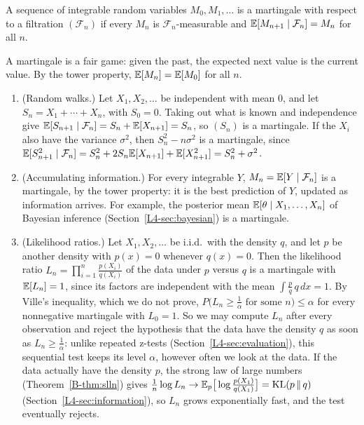 \begin{definition}[Martingale]\label{B-def:martingale}
    A sequence of integrable random variables $M_0, M_1, \ldots$ is a martingale with respect to a filtration $(\mathcal{F}_n)$ if every $M_n$ is $\mathcal{F}_n$-measurable and $\mathbb{E}[M_{n+1} \mid \mathcal{F}_n] = M_n$ for all $n$.
\end{definition}

A martingale is a fair game: given the past, the expected next value is the current value. By the tower property, $\mathbb{E}[M_n] = \mathbb{E}[M_0]$ for all $n$.

\begin{example}\label{B-ex:martingales}
    \begin{enumerate}
        \item (Random walks.) Let $X_1, X_2, \ldots$ be independent with mean $0$, and let $S_n = X_1 + \cdots + X_n$, with $S_0 = 0$. Taking out what is known and independence give $\mathbb{E}[S_{n+1} \mid \mathcal{F}_n] = S_n + \mathbb{E}[X_{n+1}] = S_n$, so $(S_n)$ is a martingale. If the $X_i$ also have the variance $\sigma^2$, then $S_n^2 - n\sigma^2$ is a martingale, since $\mathbb{E}[S_{n+1}^2 \mid \mathcal{F}_n] = S_n^2 + 2S_n\mathbb{E}[X_{n+1}] + \mathbb{E}[X_{n+1}^2] = S_n^2 + \sigma^2$.
        \item (Accumulating information.) For every integrable $Y$, $M_n = \mathbb{E}[Y \mid \mathcal{F}_n]$ is a martingale, by the tower property: it is the best prediction of $Y$, updated as information arrives. For example, the posterior mean $\mathbb{E}[\theta \mid X_1, \ldots, X_n]$ of Bayesian inference (Section~\ref{L4-sec:bayesian}) is a martingale.
        \item (Likelihood ratios.) Let $X_1, X_2, \ldots$ be i.i.d.\ with the density $q$, and let $p$ be another density with $p(x) = 0$ whenever $q(x) = 0$. Then the likelihood ratio $L_n = \prod_{i=1}^n \frac{p(X_i)}{q(X_i)}$ of the data under $p$ versus $q$ is a martingale with $\mathbb{E}[L_n] = 1$, since its factors are independent with the mean $\int \frac{p}{q}\,q\, dx = 1$. By Ville's inequality, which we do not prove, $P\big(L_n \geq \frac{1}{\alpha} \text{ for some } n\big) \leq \alpha$ for every nonnegative martingale with $L_0 = 1$. So we may compute $L_n$ after every observation and reject the hypothesis that the data have the density $q$ as soon as $L_n \geq \frac{1}{\alpha}$: unlike repeated z-tests (Section~\ref{L4-sec:evaluation}), this sequential test keeps its level $\alpha$, however often we look at the data. If the data actually have the density $p$, the strong law of large numbers (Theorem~\ref{B-thm:slln}) gives $\frac{1}{n}\log L_n \to \mathbb{E}_p\big[\log\frac{p(X_1)}{q(X_1)}\big] = \operatorname{KL}(p \,\|\, q)$ (Section~\ref{L4-sec:information}), so $L_n$ grows exponentially fast, and the test eventually rejects.
    \end{enumerate}
\end{example}

